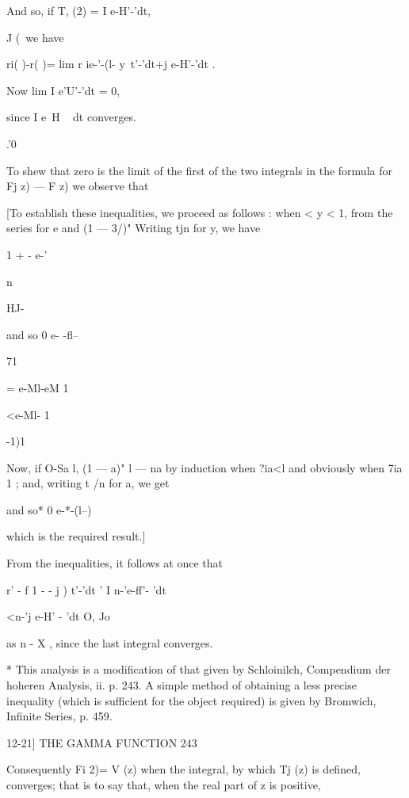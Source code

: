 And so, if T, (2) = I e-H'-'dt,

J (\ we have

ri( )-r( )= lim r ie-'-(l- y\ t'-'dt+j e-H'-'dt .

Now lim I e'U'-'dt = 0,

since I e~H ~ dt converges.

.'0

To shew that zero is the limit of the first of the two integrals in
the formula for Fj z) — F z) we observe that

[To establish these inequalities, we proceed as follows : when < y <
1, from the series for e and (1 — 3/)" Writing tjn for y, we have



1 + - e-'

n



HJ-



and so 0 e- -fl--

71



= e-Ml-eM 1



<e-Ml- 1



-1)1



Now, if O-Sa l, (1 — a)" l — na by induction when ?ia<l and obviously
when 7ia 1 ; and, writing t /n for a, we get

and so* 0 e-*-(l--) %

which is the required result.]

From the inequalities, it follows at once that

r' - f 1 - - j ) t'-'dt ' I n-'e-ff'- 'dt

<n-'j e-H' - 'dt O, Jo

as n - X , since the last integral converges.

* This analysis is a modification of that given by Schloinilch,
Compendium der hoheren Analysis, ii. p. 243. A simple method of
obtaining a less precise inequality (which is sufficient for the
object required) is given by Bromwich, Infinite Series, p. 459.



12-21] THE GAMMA FUNCTION 243

Consequently Fi 2)= V (z) when the integral, by which Tj (z) is
defined, converges; that is to say that, when the real part of z is
positive,

